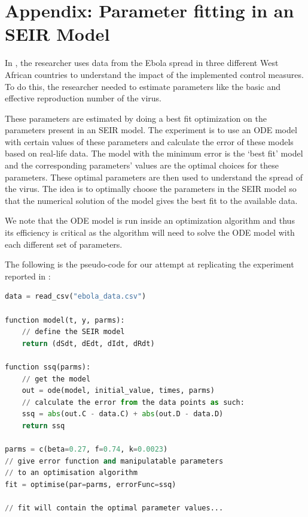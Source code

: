 \section{Appendix: Parameter fitting in an SEIR Model}
\label{section:ebola_paper}
In \cite{althaus2014estimating}, the researcher uses data from the Ebola spread in three different West African countries to understand the impact of the implemented control measures. To do this, the researcher needed to estimate parameters like the basic and effective reproduction number of the virus.

These parameters are estimated by doing a best fit optimization on the parameters present in an SEIR model. The experiment is to use an ODE model with certain values of these parameters and calculate the error of these models based on real-life data. The model with the minimum error is the `best fit' model and the corresponding parameters' values are the optimal choices for these parameters. These optimal parameters are then used to understand the spread of the virus. The idea is to optimally choose the parameters in the SEIR model so that the numerical solution of the model gives the best fit to the available data.

We note that the ODE model is run inside an optimization algorithm and thus its efficiency is critical as the algorithm will need to solve the ODE model with each different set of parameters.

The following is the pseudo-code for our attempt at replicating the experiment reported in \cite{althaus2014estimating}:

\begin{minipage}{\linewidth}
\begin{lstlisting}[language=Python]
data = read_csv("ebola_data.csv")

function model(t, y, parms):
    // define the SEIR model
    return (dSdt, dEdt, dIdt, dRdt)

function ssq(parms):
    // get the model
    out = ode(model, initial_value, times, parms)
    // calculate the error from the data points as such:
    ssq = abs(out.C - data.C) + abs(out.D - data.D)
    return ssq

parms = c(beta=0.27, f=0.74, k=0.0023)
// give error function and manipulatable parameters
// to an optimisation algorithm
fit = optimise(par=parms, errorFunc=ssq)

// fit will contain the optimal parameter values...
\end{lstlisting}
\end{minipage}

